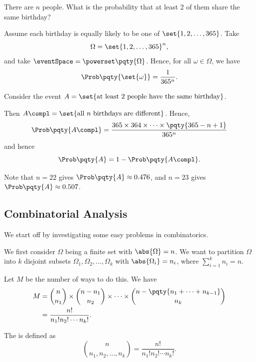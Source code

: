 \begin{example}
    \label{ex:birthbay-problem}%
    There are \(n\) people. What is the probability that at least 2 of them share the same birthday?
        
    Assume each birthday is equally likely to be one of \(\set{1, 2, \ldots, 365}\). Take
    \[
        \Omega = \set{1, 2, \ldots, 365}^n,
    \]
    and take \(\eventSpace = \powerset\pqty{\Omega}\). Hence, for all \(\omega \in \Omega\), we have
    \[
        \Prob\pqty{\set{\omega}} = \frac{1}{365^n}.
    \]

    Consider the event \(A = \set{\text{at least 2 people have the same birthday}}\).

    Then \(A\compl = \set{\text{all }n\text{ birthdays are different}}\). Hence,
    \[
        \Prob\pqty{A\compl} = \frac{365 \times 364 \times \cdots \times \pqty{365 - n + 1}}{365^n}
    \]
    and hence
    \[
        \Prob\pqty{A} = 1 - \Prob\pqty{A\compl}.
    \]

    Note that \(n = 22\) gives \(\Prob\pqty{A} \approx 0.476\), and \(n = 23\) gives \(\Prob\pqty{A} \approx 0.507\).
\end{example}

\subsection{Combinatorial Analysis}
We start off by investigating some easy problems in combinatorics.

\begin{example}
    \label{ex:partition-sets-given-size}%
    We first consider \(\Omega\) being a finite set with \(\abs{\Omega} = n\). We want to partition \(\Omega\) into \(k\) disjoint subsets \(\Omega_1, \Omega_2, \ldots, \Omega_k\) with \(\abs{\Omega_i} = n_i\), where \(\sum_{i = 1}^{k} n_i = n\).

    Let \(M\) be the number of ways to do this. We have
    \begin{align*}
        M &= \binom{n}{n_1} \times \binom{n - n_1}{n_2} \times \cdots \times \binom{n - \pqty{n_1 + \cdots + n_{k - 1}}}{n_k} \\
        &= \frac{n!}{n_1! n_2! \cdots n_k!}.
    \end{align*}
\end{example}

\begin{definition}
    \label{def:multinomial-coeff}%
    The  is defined as
    \[
        \binom{n}{n_1, n_2, \ldots, n_k} = \frac{n!}{n_1! n_2! \cdots n_k!}.
    \]
\end{definition}

